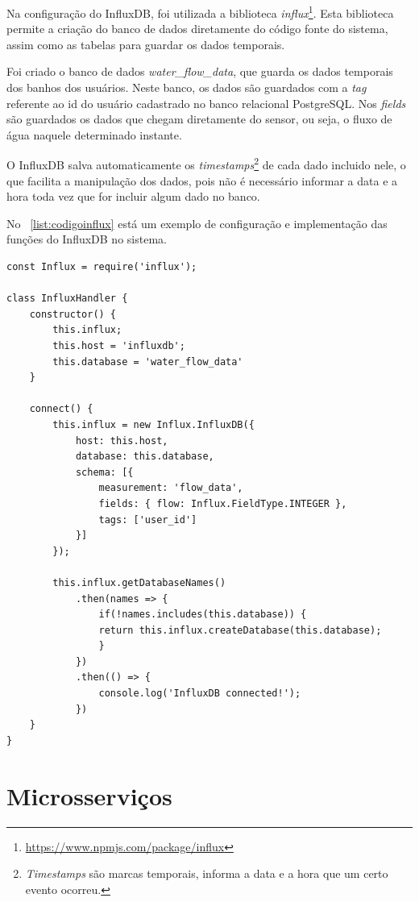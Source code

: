 Na configuração do InfluxDB, foi utilizada a biblioteca \textit{influx}\footnote{\url{https://www.npmjs.com/package/influx}}. Esta biblioteca permite a criação do banco de dados diretamente do código fonte do sistema, assim como as tabelas para guardar os dados temporais.

Foi criado o banco de dados \textit{water\_flow\_data}, que guarda os dados temporais dos banhos dos usuários. Neste banco, os dados são guardados com a \textit{tag} referente ao id do usuário cadastrado no banco relacional PostgreSQL. Nos \textit{fields} são guardados os dados que chegam diretamente do sensor, ou seja, o fluxo de água naquele determinado instante.

O InfluxDB salva automaticamente os \textit{timestamps}\footnote{\textit{Timestamps} são marcas temporais, informa a data e a hora que um certo evento ocorreu.} de cada dado incluido nele, o que facilita a manipulação dos dados, pois não é necessário informar a data e a hora toda vez que for incluir algum dado no banco.

No \lstlistingname\ \ref{list:codigoinflux} está um exemplo de configuração e implementação das funções do InfluxDB no sistema.

\newpage


\begin{lstlisting}[label=list:codigoinflux, caption=Exemplo do código de configuração do InfluxDB]
const Influx = require('influx');

class InfluxHandler {
	constructor() {
		this.influx;
		this.host = 'influxdb';
		this.database = 'water_flow_data'
	}
	
	connect() {
		this.influx = new Influx.InfluxDB({
			host: this.host,
			database: this.database,
			schema: [{
				measurement: 'flow_data',
				fields: { flow: Influx.FieldType.INTEGER },
				tags: ['user_id']
			}]
		});
		
		this.influx.getDatabaseNames()
			.then(names => {
				if(!names.includes(this.database)) {
				return this.influx.createDatabase(this.database);
				}
			})
			.then(() => {
				console.log('InfluxDB connected!');
			})
	}
}
\end{lstlisting}

\section{Microsserviços}

